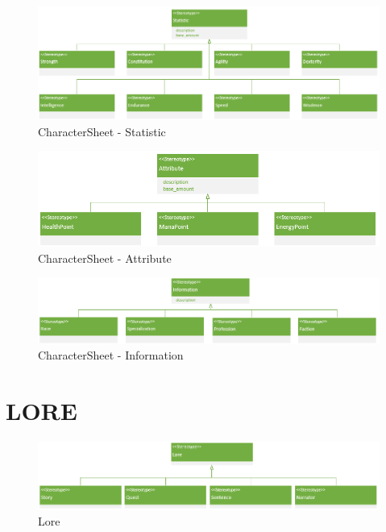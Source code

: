 \begin{figure}[H]
    \begin{center}
    \includegraphics[width=\linewidth]{10_img/Z_annexeA/cs_statistic.PNG} 
    \caption{CharacterSheet - Statistic}
    \label{A-Statistic}
    \end{center}
\end{figure}


\begin{figure}[H]
    \begin{center}
    \includegraphics[width=14cm]{10_img/Z_annexeA/cs_attribute.PNG} 
    \caption{CharacterSheet - Attribute}
    \label{A-Attribute}
    \end{center}
\end{figure}

\begin{figure}[H]
    \begin{center}
    \includegraphics[width=15cm]{10_img/Z_annexeA/cs_information.PNG} 
    \caption{CharacterSheet - Information}
    \label{A-Information}
    \end{center}
\end{figure}


\section{LORE} 
\begin{figure}[H]
    \begin{center}
    \includegraphics[width=15cm]{10_img/Z_annexeA/lore.PNG} 
    \caption{Lore}
    \label{A-Lore}
    \end{center}
\end{figure}


